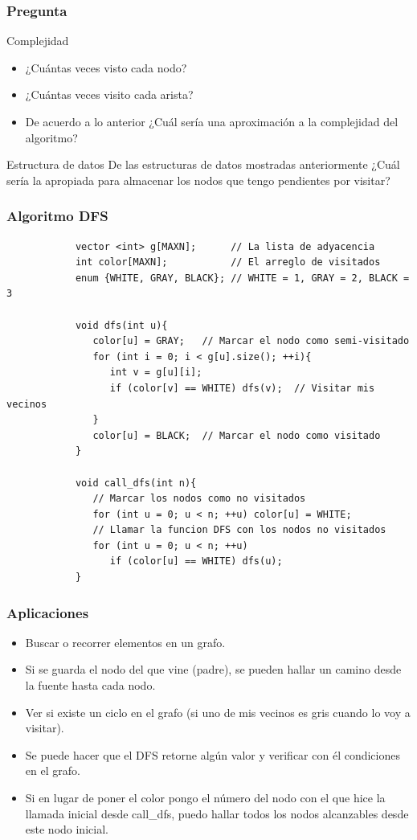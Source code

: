 \documentclass{beamer}
\begin{document}
	\begin{frame}
		\frametitle{Pregunta}
		\begin{alertblock}{Complejidad}
			\begin{itemize}
				\item ¿Cuántas veces visto cada nodo?
				\item ¿Cuántas veces visito cada arista?
				\item De acuerdo a lo anterior ¿Cuál sería una aproximación a la complejidad del algoritmo?
			\end{itemize}
		\end{alertblock}
		\pause
		\begin{alertblock}{Estructura de datos}
			De las estructuras de datos mostradas anteriormente ¿Cuál sería la apropiada para almacenar los nodos que tengo pendientes por visitar?
		\end{alertblock}
	\end{frame}
	
	\begin{frame}[fragile]
		\frametitle{Algoritmo DFS}
		\begin{lstlisting}
			vector <int> g[MAXN];      // La lista de adyacencia
			int color[MAXN];           // El arreglo de visitados
			enum {WHITE, GRAY, BLACK}; // WHITE = 1, GRAY = 2, BLACK = 3

			void dfs(int u){
			   color[u] = GRAY;   // Marcar el nodo como semi-visitado
			   for (int i = 0; i < g[u].size(); ++i){
			      int v = g[u][i];
			      if (color[v] == WHITE) dfs(v);  // Visitar mis vecinos
			   }
			   color[u] = BLACK;  // Marcar el nodo como visitado
			}

			void call_dfs(int n){
			   // Marcar los nodos como no visitados
			   for (int u = 0; u < n; ++u) color[u] = WHITE;
			   // Llamar la funcion DFS con los nodos no visitados
			   for (int u = 0; u < n; ++u)
			      if (color[u] == WHITE) dfs(u);
			}
		\end{lstlisting}
	\end{frame}
	
	\begin{frame}
		\frametitle{Aplicaciones}
		\begin{itemize}
			\item Buscar o recorrer elementos en un grafo.
			\item Si se guarda el nodo del que vine (padre), se pueden hallar un camino desde la fuente hasta cada nodo.
			\item Ver si existe un ciclo en el grafo (si uno de mis vecinos es gris cuando lo voy a visitar).
			\item Se puede hacer que el DFS retorne algún valor y verificar con él condiciones en el grafo.
			\item Si en lugar de poner el color pongo el número del nodo con el que hice la llamada inicial desde call\_dfs, puedo hallar todos los nodos alcanzables desde este nodo inicial.
		\end{itemize}
	\end{frame}
	
\end{document}
